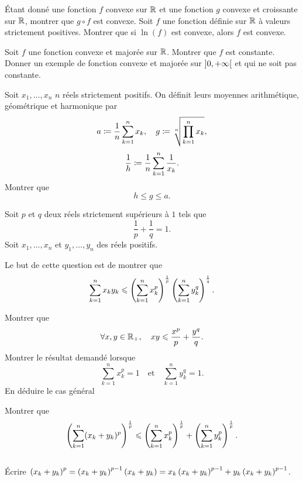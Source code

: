 \documentclass{magnolia}
\begin{document}
\begin{questions}
\question Étant donné une fonction $f$ convexe sur $\mathbb{R}$ et une fonction $g$
  convexe et croissante sur $\mathbb{R}$, montrer que $g\circ f$ est convexe.
\question Soit $f$ une fonction définie sur $\mathbb{R}$ à valeurs strictement
  positives. Montrer que si $\ln(f)$ est convexe, alors $f$ est convexe.
\end{questions}

\begin{questions}
\question Soit $f$ une fonction convexe et majorée sur $\mathbb{R}$. Montrer que $f$
  est constante.
\question Donner un exemple de fonction convexe et majorée sur
  $\left]0,+\infty\right[$ et qui ne soit pas constante.
\end{questions}

Soit $x_1,\ldots,x_n$ $n$ réels strictement positifs. On définit leurs
moyennes arithmétique, géométrique et harmonique par
\[a\coloneqq \frac{1}{n}\sum_{k=1}^n x_k, \quad g\coloneqq\sqrt[n]{\prod_{k=1}^n x_k},\]
\[\frac{1}{h}\coloneqq \frac{1}{n}\sum_{k=1}^n \frac{1}{x_k}.\]
Montrer que
\[h\leq g\leq a.\]

Soit $p$ et $q$ deux réels strictement supérieurs à $1$ tels que
\[\frac{1}{p}+\frac{1}{q}=1.\]
Soit $x_1,\ldots,x_n$ et $y_1,\ldots,y_n$ des réels positifs.
\begin{questions}
\question Le but de cette question est de montrer que
  \[\sum_{k=1}^n x_k y_k \leqslant \left(\sum_{k=1}^n x_k^p\right)^{\frac{1}{p}}
                              \left(\sum_{k=1}^n y_k^q\right)^{\frac{1}{q}}.\]
  \begin{questions}
  \question Montrer que
    \[\forall x,y\in\mathbb{R}_+ ,\quad xy\leqslant\frac{x^p}{p}+\frac{y^q}{q}.\]
  \question Montrer le résultat demandé lorsque
    \[\sum_{k=1}^n x_k^p=1 \quad \text{et} \quad \sum_{k=1}^n y_k^q=1.\]
  \question En déduire le cas général
  \end{questions}
\question Montrer que
  \[\left(\sum_{k=1}^n (x_k+y_k)^p\right)^{\frac{1}{p}} \leqslant
    \left(\sum_{k=1}^n x_k^p\right)^{\frac{1}{p}}+
    \left(\sum_{k=1}^n y_k^p\right)^{\frac{1}{p}}.\]
\end{questions}
\begin{sol}
$\quad$
\begin{questions}
\question Écrire $\left(x_k+y_k\right)^p=\left(x_k+y_k\right)^{p-1}\left(x_k+y_k\right)=x_k\left(x_k+y_k\right)^{p-1}
  +y_k\left(x_k+y_k\right)^{p-1}$.
\end{questions}
\end{sol}

\end{document}
